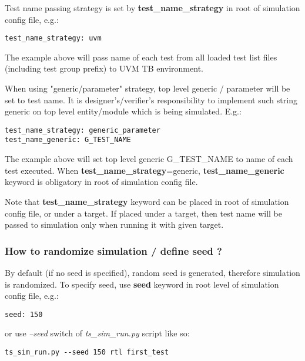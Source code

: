 \documentclass{tropic_design_spec}
\begin{document}
Test name passing strategy is set by \textbf{test_name_strategy} in root of simulation
config file, e.g.:

\begin{lstlisting}
test_name_strategy: uvm
\end{lstlisting}

The example above will pass name of each test from all loaded test list files (including
test group prefix) to UVM TB environment.

When using "generic/parameter" strategy, top level generic / parameter will be set to test name. It
is designer's/verifier's responsibility to implement such string generic on top level
entity/module which is being simulated. E.g.:

\begin{lstlisting}
test_name_strategy: generic_parameter
test_name_generic: G_TEST_NAME
\end{lstlisting}

The example above will set top level generic G_TEST_NAME to name of each test executed.
When \textbf{test_name_strategy}=generic, \textbf{test_name_generic} keyword is obligatory
in root of simulation config file.

Note that \textbf{test_name_strategy} keyword can be placed in root of simulation config
file, or under a target. If placed under a target, then test name will be passed to
simulation only when running it with given target.


\subsubsection{How to randomize simulation / define seed ?}
\label{sec:how-to-randomize-simulation-define-seed}

By default (if no seed is specified), random seed is generated, therefore simulation
is randomized. To specify seed, use \textbf{seed} keyword in root level of simulation
config file, e.g.:

\begin{lstlisting}
seed: 150
\end{lstlisting}

or use \textit{--seed} switch of \textit{ts_sim_run.py} script like so:

\begin{lstlisting}
ts_sim_run.py --seed 150 rtl first_test
\end{lstlisting}
\end{document}
